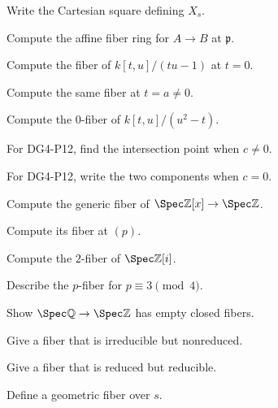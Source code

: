 \begin{exercise}\label{exr:vi25-01}
Write the Cartesian square defining $X_s$.
\end{exercise}
\begin{exercise}\label{exr:vi25-02}
Compute the affine fiber ring for $A\to B$ at $\mathfrak p$.
\end{exercise}
\begin{exercise}\label{exr:vi25-03}
Compute the fiber of $k[t,u]/(tu-1)$ at $t=0$.
\end{exercise}
\begin{exercise}\label{exr:vi25-04}
Compute the same fiber at $t=a\ne0$.
\end{exercise}
\begin{exercise}\label{exr:vi25-05}
Compute the $0$-fiber of $k[t,u]/(u^2-t)$.
\end{exercise}
\begin{exercise}\label{exr:vi25-06}
For DG4-P12, find the intersection point when $c\ne0$.
\end{exercise}
\begin{exercise}\label{exr:vi25-07}
For DG4-P12, write the two components when $c=0$.
\end{exercise}
\begin{exercise}\label{exr:vi25-08}
Compute the generic fiber of $\Spec\mathbb Z[x]\to\Spec\mathbb Z$.
\end{exercise}
\begin{exercise}\label{exr:vi25-09}
Compute its fiber at $(p)$.
\end{exercise}
\begin{exercise}\label{exr:vi25-10}
Compute the $2$-fiber of $\Spec\mathbb Z[i]$.
\end{exercise}
\begin{exercise}\label{exr:vi25-11}
Describe the $p$-fiber for $p\equiv3\pmod4$.
\end{exercise}
\begin{exercise}\label{exr:vi25-12}
Show $\Spec\mathbb Q\to\Spec\mathbb Z$ has empty closed fibers.
\end{exercise}
\begin{exercise}\label{exr:vi25-13}
Give a fiber that is irreducible but nonreduced.
\end{exercise}
\begin{exercise}\label{exr:vi25-14}
Give a fiber that is reduced but reducible.
\end{exercise}
\begin{exercise}\label{exr:vi25-15}
Define a geometric fiber over $s$.
\end{exercise}
